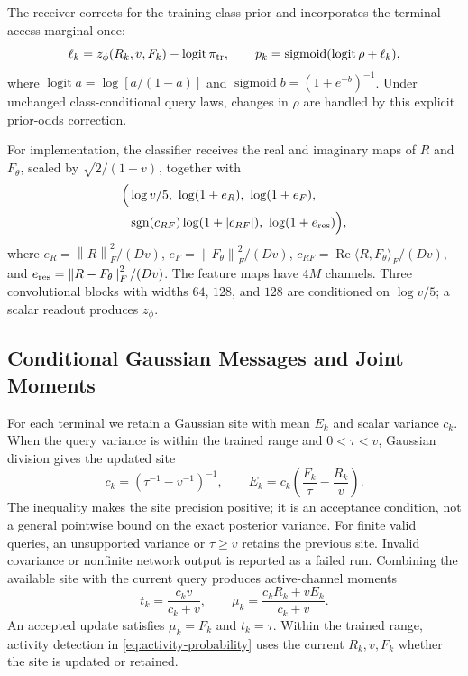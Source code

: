 \documentclass[10pt,a4paper]{article}
\newcommand{\logit}{\operatorname{logit}}
\newcommand{\sigmoid}{\operatorname{sigmoid}}
\newcommand{\relu}{\operatorname{Re}}
\newcommand{\norm}[1]{\left\lVert#1\right\rVert}
\begin{document}
The receiver corrects for the training class prior and incorporates the
terminal access marginal once:
\begin{equation}
 \ell_k=z_\phi(R_k,v,F_k)-\logit\pi_{\rm tr},\qquad
 p_k=\sigmoid(\logit\rho+\ell_k),
 \label{eq:activity-probability}
\end{equation}
where $\logit a=\log[a/(1-a)]$ and
$\sigmoid b=(1+e^{-b})^{-1}$. Under unchanged class-conditional query
laws, changes in $\rho$ are handled by this explicit prior-odds correction.

For implementation, the classifier receives the real and imaginary maps
of $R$ and $F_\theta$, scaled by $\sqrt{2/(1+v)}$, together with
\begin{equation}
 \begin{aligned}
 \Big(&\log v/5,\ \log(1+e_R),\ \log(1+e_F),\\
      &\operatorname{sgn}(c_{RF})\log(1+|c_{RF}|),\
       \log(1+e_{\rm res})\Big),
 \end{aligned}
 \label{eq:classifier-features}
\end{equation}
where $e_R=\norm{R}_F^2/(Dv)$,
$e_F=\norm{F_\theta}_F^2/(Dv)$,
$c_{RF}=\relu\langle R,F_\theta\rangle_F/(Dv)$, and
$e_{\rm res}=\norm{R-F_\theta}_F^2/(Dv)$. The feature maps have $4M$
channels. Three convolutional blocks with widths $64$, $128$, and $128$
are conditioned on $\log v/5$; a scalar readout produces $z_\phi$.

\subsection{Conditional Gaussian Messages and Joint Moments}

For each terminal we retain a Gaussian site with mean $E_k$ and scalar
variance $c_k$. When the query variance is within the trained range and
$0<\tau<v$, Gaussian division gives the updated site
\begin{equation}
 c_k=(\tau^{-1}-v^{-1})^{-1},\qquad
 E_k=c_k\left(\frac{F_k}{\tau}-\frac{R_k}{v}\right).
 \label{eq:site-update}
\end{equation}
The inequality makes the site precision positive; it is an acceptance
condition, not a general pointwise bound on the exact posterior variance.
For finite valid queries, an unsupported variance or $\tau\geq v$
retains the previous site. Invalid covariance or nonfinite network output
is reported as a failed run. Combining the available site with the
current query produces active-channel moments
\begin{equation}
 t_k=\frac{c_kv}{c_k+v},\qquad
 \mu_k=\frac{c_kR_k+vE_k}{c_k+v}.
 \label{eq:conditional-moments}
\end{equation}
An accepted update satisfies $\mu_k=F_k$ and $t_k=\tau$.
Within the trained range, activity detection in
\eqref{eq:activity-probability} uses the current $R_k,v,F_k$ whether
the site is updated or retained.
\end{document}
